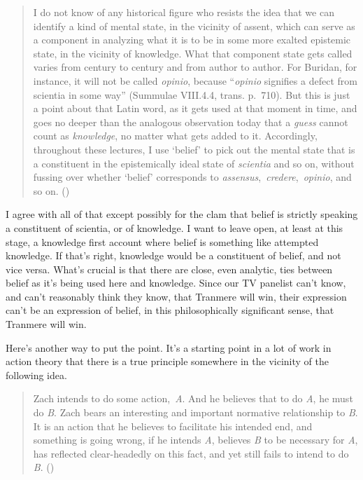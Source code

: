 \documentclass[
  10pt,
  letterpaper,
  twoside]{scrbook}
\begin{document}
\begin{quote}
I do not know of any historical figure who resists the idea that we can
identify a kind of mental state, in the vicinity of assent, which can
serve as a component in analyzing what it is to be in some more exalted
epistemic state, in the vicinity of knowledge. What that component state
gets called varies from century to century and from author to author.
For Buridan, for instance, it will not be called \emph{opinio}, because
``\emph{opinio} signifies a defect from scientia in some way'' (Summulae
VIII.4.4, trans. p.~710). But this is just a point about that Latin
word, as it gets used at that moment in time, and goes no deeper than
the analogous observation today that a \emph{guess} cannot count as
\emph{knowledge}, no matter what gets added to it. Accordingly,
throughout these lectures, I use `belief' to pick out the mental state
that is a constituent in the epistemically ideal state of
\emph{scientia} and so on, without fussing over whether `belief'
corresponds to \emph{assensus},~\emph{credere},~\emph{opinio}, and so
on. ()
\end{quote}

I agree with all of that except possibly for the clam that belief is
strictly speaking a constituent of scientia, or of knowledge. I want to
leave open, at least at this stage, a knowledge first account where
belief is something like attempted knowledge. If that's right, knowledge
would be a constituent of belief, and not vice versa. What's crucial is
that there are close, even analytic, ties between belief as it's being
used here and knowledge. Since our TV panelist can't know, and can't
reasonably think they know, that Tranmere will win, their expression
can't be an expression of belief, in this philosophically significant
sense, that Tranmere will win.

Here's another way to put the point. It's a starting point in a lot of
work in action theory that there is a true principle somewhere in the
vicinity of the following idea.

\begin{quote}
Zach intends to do some action,~\emph{A}. And he believes that to do
\emph{A}, he must do \emph{B}. Zach bears an interesting and important
normative relationship to \emph{B}. It is an action that he believes to
facilitate his intended end, and something is going wrong, if he intends
\emph{A}, believes \emph{B} to be necessary for \emph{A}, has reflected
clear-headedly on this fact, and yet still fails to intend to do
\emph{B}. ()
\end{quote}
\end{document}
